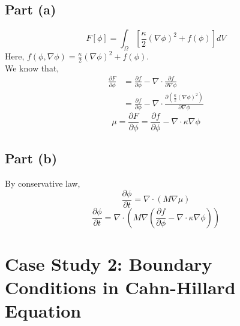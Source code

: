 \documentclass[12pt]{article}
\begin{document}
\subsection*{Part (a)}
\begin{equation*}
    F[\phi] = \int_{\Omega} [\frac{\kappa}{2} (\nabla \phi)^2 + f(\phi)] dV
\end{equation*}
Here, $f(\phi, \nabla \phi) = \frac{\kappa}{2} (\nabla \phi)^2 + f(\phi)$.\\
We know that,
\begin{equation*}
    \begin{split}
        \frac{\partial F}{\partial \phi} &= \frac{\partial f}{\partial \phi} - \nabla \cdot \frac{\partial f}{\partial \nabla \phi} \\
        &= \frac{\partial f}{\partial \phi} - \nabla \cdot \frac{\partial (\frac{\kappa}{2} (\nabla \phi)^2)}{\partial \nabla \phi} 
    \end{split}
\end{equation*}
\begin{equation*}
    \boxed{\mu = \frac{\partial F}{\partial \phi} = \frac{\partial f}{\partial \phi} - \nabla \cdot \kappa \nabla \phi} 
\end{equation*}

\subsection*{Part (b)}
By conservative law, 
\begin{equation*}
    \frac{\partial \phi}{\partial t} = \nabla \cdot (M \nabla \mu)
\end{equation*}
\begin{equation*}
    \boxed{\frac{\partial \phi}{\partial t} = \nabla \cdot (M \nabla (\frac{\partial f}{\partial \phi} - \nabla \cdot \kappa \nabla \phi))}
\end{equation*}

\section*{Case Study 2: Boundary Conditions in Cahn-Hillard Equation}
\end{document}

